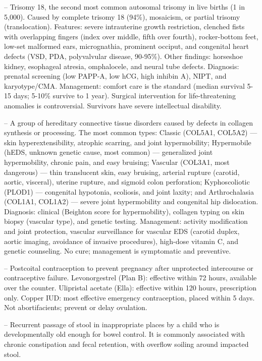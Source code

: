 -- Trisomy 18, the second most common autosomal trisomy in live births (1 in 5,000). Caused by complete trisomy 18 (94\%), mosaicism, or partial trisomy (translocation). Features: severe intrauterine growth restriction, clenched fists with overlapping fingers (index over middle, fifth over fourth), rocker-bottom feet, low-set malformed ears, micrognathia, prominent occiput, and congenital heart defects (VSD, PDA, polyvalvular disease, 90-95\%). Other findings: horseshoe kidney, esophageal atresia, omphalocele, and neural tube defects. Diagnosis: prenatal screening (low PAPP-A, low hCG, high inhibin A), NIPT, and karyotype/CMA. Management: comfort care is the standard (median survival 5-15 days; 5-10\% survive to 1 year). Surgical intervention for life-threatening anomalies is controversial. Survivors have severe intellectual disability.

-- A group of hereditary connective tissue disorders caused by defects in collagen synthesis or processing. The most common types: Classic (COL5A1, COL5A2) — skin hyperextensibility, atrophic scarring, and joint hypermobility; Hypermobile (hEDS, unknown genetic cause, most common) — generalized joint hypermobility, chronic pain, and easy bruising; Vascular (COL3A1, most dangerous) — thin translucent skin, easy bruising, arterial rupture (carotid, aortic, visceral), uterine rupture, and sigmoid colon perforation; Kyphoscoliotic (PLOD1) — congenital hypotonia, scoliosis, and joint laxity; and Arthrochalasia (COL1A1, COL1A2) — severe joint hypermobility and congenital hip dislocation. Diagnosis: clinical (Beighton score for hypermobility), collagen typing on skin biopsy (vascular type), and genetic testing. Management: activity modification and joint protection, vascular surveillance for vascular EDS (carotid duplex, aortic imaging, avoidance of invasive procedures), high-dose vitamin C, and genetic counseling. No cure; management is symptomatic and preventive.

-- Postcoital contraception to prevent pregnancy after unprotected intercourse or contraceptive failure. Levonorgestrel (Plan B): effective within 72 hours, available over the counter. Ulipristal acetate (Ella): effective within 120 hours, prescription only. Copper IUD: most effective emergency contraception, placed within 5 days. Not abortifacients; prevent or delay ovulation.

-- Recurrent passage of stool in inappropriate places by a child who is developmentally old enough for bowel control. It is commonly associated with chronic constipation and fecal retention, with overflow soiling around impacted stool.

